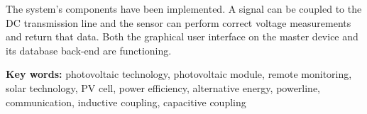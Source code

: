 The system's components have been implemented. A  signal can be coupled to the
DC transmission line  and the sensor can perform  correct voltage measurements
and return that  data. Both the graphical user interface on  the master device
and its database back-end are functioning.

\vspace{2em}
\textbf{Key  words:}  photovoltaic  technology,  photovoltaic  module,  remote
monitoring, solar technology, PV cell, power efficiency, alternative energy,
powerline, communication, inductive coupling, capacitive coupling
